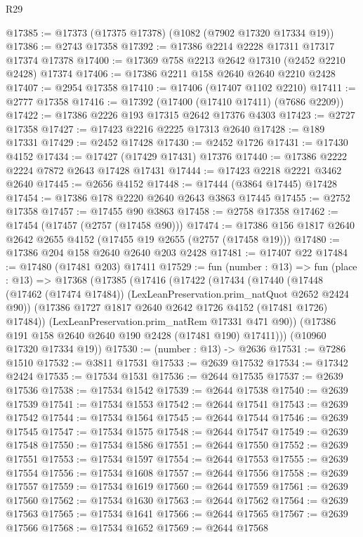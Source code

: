 \begin{lexlean}{R29}
\begin{coremodule}
@17385 := @17373 (@17375 @17378) (@1082 (@7902 @17320 @17334 @19))
@17386 := @2743 @17358
@17392 := @17386 @2214 @2228 @17311 @17317 @17374 @17378
@17400 := @17369 @758 @2213 @2642 @17310 (@2452 @2210 @2428) @17374
@17406 := @17386 @2211 @158 @2640 @2640 @2210 @2428
@17407 := @2954 @17358
@17410 := @17406 (@17407 @1102 @2210)
@17411 := @2777 @17358
@17416 := @17392 (@17400 (@17410 @17411) (@7686 @2209))
@17422 := @17386 @2226 @193 @17315 @2642 @17376 @4303
@17423 := @2727 @17358
@17427 := @17423 @2216 @2225 @17313 @2640
@17428 := @189 @17331
@17429 := @2452 @17428
@17430 := @2452 @1726
@17431 := @17430 @4152
@17434 := @17427 (@17429 @17431) @17376
@17440 := @17386 @2222 @2224 @7872 @2643 @17428 @17431
@17444 := @17423 @2218 @2221 @3462 @2640
@17445 := @2656 @4152
@17448 := @17444 (@3864 @17445) @17428
@17454 := @17386 @178 @2220 @2640 @2643 @3863 @17445
@17455 := @2752 @17358
@17457 := @17455 @90 @3863
@17458 := @2758 @17358
@17462 := @17454 (@17457 (@2757 (@17458 @90)))
@17474 := @17386 @156 @1817 @2640 @2642 @2655 @4152 (@17455 @19 @2655 (@2757 (@17458 @19)))
@17480 := @17386 @204 @158 @2640 @2640 @203 @2428
@17481 := @17407 @22
@17484 := @17480 (@17481 @203) @17411
@17529 := fun (number : @13) =>
  fun (place : @13) =>
  @17368
    (@17385
      (@17416
        (@17422
          (@17434
            (@17440
              (@17448 (@17462 (@17474 @17484)) (LexLeanPreservation.prim_natQuot @2652 @2424 @90))
              (@17386 @1727 @1817 @2640 @2642 @1726 @4152 (@17481 @1726) @17484))
            (LexLeanPreservation.prim_natRem @17331 @471 @90))
          (@17386 @191 @158 @2640 @2640 @190 @2428 (@17481 @190) @17411)))
      (@10960 @17320 @17334 @19))
@17530 := (number : @13) -> @2636
@17531 := @7286 @1510
@17532 := @3811 @17531
@17533 := @2639 @17532
@17534 := @17342 @2424
@17535 := @17534 @1531
@17536 := @2644 @17535
@17537 := @2639 @17536
@17538 := @17534 @1542
@17539 := @2644 @17538
@17540 := @2639 @17539
@17541 := @17534 @1553
@17542 := @2644 @17541
@17543 := @2639 @17542
@17544 := @17534 @1564
@17545 := @2644 @17544
@17546 := @2639 @17545
@17547 := @17534 @1575
@17548 := @2644 @17547
@17549 := @2639 @17548
@17550 := @17534 @1586
@17551 := @2644 @17550
@17552 := @2639 @17551
@17553 := @17534 @1597
@17554 := @2644 @17553
@17555 := @2639 @17554
@17556 := @17534 @1608
@17557 := @2644 @17556
@17558 := @2639 @17557
@17559 := @17534 @1619
@17560 := @2644 @17559
@17561 := @2639 @17560
@17562 := @17534 @1630
@17563 := @2644 @17562
@17564 := @2639 @17563
@17565 := @17534 @1641
@17566 := @2644 @17565
@17567 := @2639 @17566
@17568 := @17534 @1652
@17569 := @2644 @17568

\end{coremodule}
\end{lexlean}
